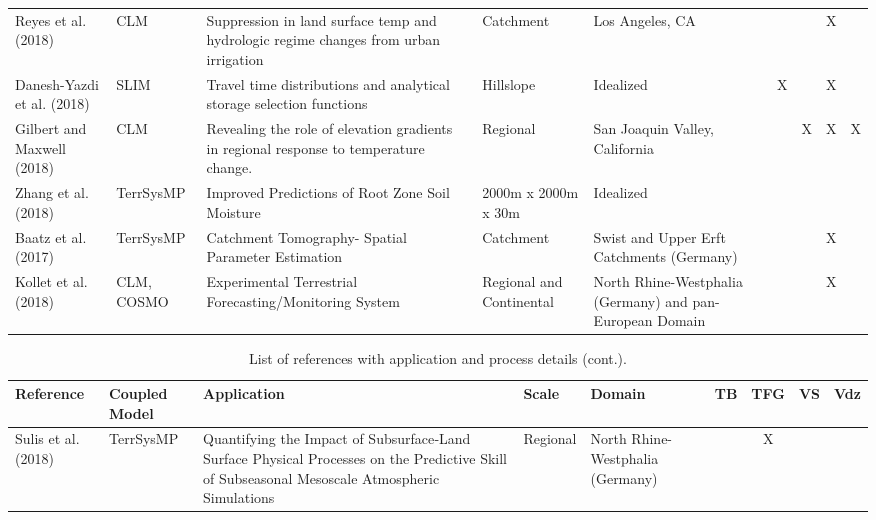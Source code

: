{\begin{table}
\begin{tabular}{ l  p{1.5cm} p{2cm} p{1.5cm} p{1.5cm} | c | c | c | c }
\cite{Reyes2018} Reyes et al. (2018) & CLM & Suppression in land surface temp and hydrologic regime changes from urban irrigation & Catchment & Los Angeles, CA & & &X & \\	
\cite{Danesh-Yazdi2018} Danesh-Yazdi et al. (2018) & SLIM & Travel time distributions and analytical storage selection functions & Hillslope & Idealized &X & &X & \\						
\cite{Gilbert2018} Gilbert and Maxwell (2018) & CLM & Revealing the role of elevation gradients in regional response to temperature change. & Regional & San Joaquin Valley, California & &X &X &X \\ 
\cite{Zhang2018} Zhang et al. (2018) & TerrSysMP & Improved Predictions of Root Zone Soil Moisture & 2000m x 2000m x 30m  & Idealized & & & & \\	
\cite{Baatz2017} Baatz et al. (2017) & TerrSysMP & Catchment Tomography- Spatial Parameter Estimation  & Catchment & Swist and Upper Erft Catchments (Germany) & & &X & \\	
\cite{Kollet2018} Kollet et al. (2018) & CLM, COSMO & Experimental Terrestrial Forecasting/Monitoring System & Regional and Continental & North Rhine-Westphalia (Germany) and pan-European Domain & & &X & \\	

\end{tabular}
\label{pfref9}
\end{table}


\begin{table} \center
\renewcommand{\arraystretch}{2.5}
\center
\caption{List of \parflow{} references with application and process details (cont.).}
\begin{tabular}{ l  p{1.5cm} p{2cm} p{1.5cm} p{1.5cm} | c | c | c | c }
\bf{Reference} & \bf{Coupled Model} & \bf{Application} & \bf{Scale} & \bf{Domain} & \bf{TB} & \bf{TFG} & \bf{VS} & \bf{Vdz} \\   
\hline{}

\cite{Sulis2018} Sulis et al. (2018) & TerrSysMP & Quantifying the Impact of Subsurface‐Land Surface Physical Processes on the Predictive Skill of Subseasonal Mesoscale Atmospheric Simulations  & Regional & North Rhine-Westphalia (Germany) & &X & & \\
									

\end{tabular}
\end{table}}
